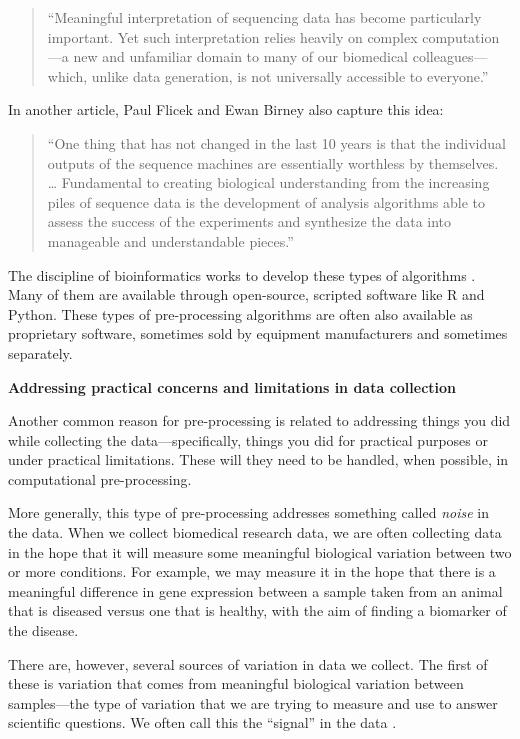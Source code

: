 \documentclass[]{tufte-book}
\begin{document}
\begin{quote}
``Meaningful interpretation of sequencing data has become particularly
important. Yet such interpretation relies heavily on complex computation---a new
and unfamiliar domain to many of our biomedical colleagues---which, unlike
data generation, is not universally accessible to everyone.''
\citep{nekrutenko2012next}
\end{quote}

In another article, Paul Flicek and Ewan Birney also capture this idea:

\begin{quote}
``One thing that has not changed in the last 10 years is that the individual
outputs of the sequence machines are essentially worthless by themselves. \ldots{}
Fundamental to creating biological understanding from
the increasing piles of sequence data is the development of analysis algorithms
able to assess the success of the experiments and synthesize the data into
manageable and understandable pieces.''
\citep{flicek2009sense}
\end{quote}

The discipline of bioinformatics works to develop these types of algorithms
\citep{barry2009new}. Many of them are available through open-source, scripted
software like R and Python. These types of pre-processing algorithms are often
also available as proprietary software, sometimes sold by equipment
manufacturers and sometimes separately.

\textbf{Addressing practical concerns and limitations in data collection}

Another common reason for pre-processing is related to addressing things you
did while collecting the data---specifically, things you did for
practical purposes or under practical limitations. These will they need to
be handled, when possible, in computational pre-processing.

More generally, this type of pre-processing addresses something called
\emph{noise} in the data. When we collect biomedical
research data, we are often collecting data in the hope that it will measure
some meaningful biological variation between two or more conditions. For
example, we may measure it in the hope that there is a meaningful difference in
gene expression between a sample taken from an animal that is diseased versus
one that is healthy, with the aim of finding a biomarker of the disease.

There are, however, several sources of variation in data we collect. The first
of these is variation that comes from meaningful biological variation between
samples---the type of variation that we are trying to measure and
use to answer scientific questions. We often call this the ``signal'' in the
data \citep{chatfield1995problem}.
\end{document}
